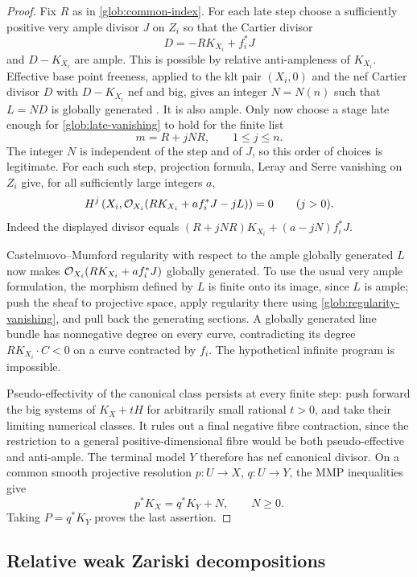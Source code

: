 \begin{proof}
Fix $R$ as in \eqref{glob:common-index}.  For each late step choose a
sufficiently positive very ample divisor $J$ on $Z_i$ so that the Cartier
divisor
\[
 D=-RK_{X_i}+f_i^*J
\]
and $D-K_{X_i}$ are ample.  This is possible by relative anti-ampleness
of $K_{X_i}$.  Effective base point freeness, applied to the klt pair
$(X_i,0)$ and the nef Cartier divisor $D$ with $D-K_{X_i}$ nef and big,
gives an integer $N=N(n)$ such that $L=ND$ is globally generated
\cite[Theorem~1.1 and Remark~1.2]{FujinoEffective}.  It is also ample.
Only now choose a stage late enough for \eqref{glob:late-vanishing} to hold
for the finite list
\[
 m=R+jNR,\qquad1\leq j\leq n.
\]
The integer $N$ is independent of the step and of $J$, so this order of
choices is legitimate.  For each such step, projection formula, Leray and
Serre vanishing on $Z_i$ give, for all sufficiently large integers $a$,
\begin{equation}\label{glob:regularity-vanishing}
 H^j\left(X_i,\mathcal O_{X_i}
       (RK_{X_i}+af_i^*J-jL)\right)=0\qquad(j>0).
\end{equation}
Indeed the displayed divisor equals
$(R+jNR)K_{X_i}+(a-jN)f_i^*J$.

Castelnuovo--Mumford regularity with respect to the ample globally generated
$L$ now makes $\mathcal O_{X_i}(RK_{X_i}+af_i^*J)$ globally generated.  To use the
usual very ample formulation, the morphism defined by $L$ is finite onto
its image, since $L$ is ample; push the sheaf to projective space, apply
regularity there using \eqref{glob:regularity-vanishing}, and pull back
the generating sections.  A globally generated line bundle has
nonnegative degree on every curve, contradicting its degree
$RK_{X_i}\cdot C<0$ on a curve contracted by $f_i$.  The hypothetical
infinite program is impossible.

Pseudo-effectivity of the canonical class persists at every finite step:
push forward the big systems of $K_X+tH$ for arbitrarily small rational
$t>0$, and take their limiting numerical classes.  It rules out a final
negative fibre contraction, since the restriction to a general
positive-dimensional fibre would be both pseudo-effective and
anti-ample.  The terminal model $Y$ therefore has nef canonical divisor.
On a common smooth projective resolution $p:U\to X$, $q:U\to Y$, the MMP
inequalities give
\[
 p^*K_X=q^*K_Y+N,\qquad N\geq0.
\]
Taking $P=q^*K_Y$ proves the last assertion.
\end{proof}

\subsection{Relative weak Zariski decompositions}

